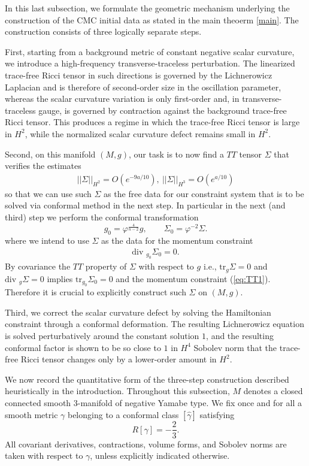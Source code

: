 \documentclass{amsart}
\renewcommand{\div}{\mbox{div }}
\newcommand{\tr}{\mbox{tr}}
\begin{document}
\noindent In this last subsection, we formulate the geometric mechanism underlying the construction of the CMC initial data as stated in the main theoerm \ref{main}. The construction consists of three logically separate steps.

\noindent First, starting from a background metric of constant negative scalar curvature, we introduce a high-frequency transverse-traceless perturbation. The linearized trace-free Ricci tensor in such directions is governed by the Lichnerowicz Laplacian and is therefore of second-order size in the oscillation parameter, whereas the scalar curvature variation is only first-order and, in transverse-traceless gauge, is governed by contraction against the background trace-free Ricci tensor. This produces a regime in which the trace-free Ricci tensor is large in \(H^{2}\), while the normalized scalar curvature defect remains small in \(H^{2}\).

\noindent Second, on this manifold $(M,g)$, our task is to now find a $TT$ tensor $\Sigma$ that verifies the estimates 
\begin{align}
||\Sigma||_{H^{2}}=O(e^{-9a/10}),~||\Sigma||_{H^{3}}=O(e^{a/10})
\end{align}
so that we can use such $\Sigma$ as the free data for our constraint system that is to be solved via conformal method in the next step. In particular in the next (and third) step we perform the conformal transformation 
\[
g_{0}=\varphi^{\frac{4}{n-2}}g,
\qquad
\Sigma_{0}=\varphi^{-2}\Sigma.
\]
where we intend to use $\Sigma$ as the data for the momentum constraint 
\begin{align}
\label{eq:TT1}
\div_{g_{0}}\Sigma_{0}=0.
\end{align}
By covariance the $TT$ property of $\Sigma$ with respect to $g$ i.e., $\tr_{g}\Sigma=0$ and $\div_{g}\Sigma=0$ implies $\tr_{g_{0}}\Sigma_{0}=0$ and the momentum constraint (\ref{eq:TT1}). Therefore it is crucial to explicitly construct such $\Sigma$ on $(M,g)$. 

\noindent Third, we correct the scalar curvature defect by solving the Hamiltonian constraint through a conformal deformation. The resulting Lichnerowicz equation is solved perturbatively around the constant solution \(1\), and the resulting conformal factor is shown to be so close to \(1\) in $H^{4}$ Sobolev norm that the trace-free Ricci tensor changes only by a lower-order amount in \(H^{2}\).




\noindent We now record the quantitative form of the three-step construction described heuristically in the introduction. Throughout this subsection, \(M\) denotes a closed connected smooth \(3\)-manifold of negative Yamabe type. We fix once and for all a smooth metric \(\gamma\) belonging to a conformal class $[\widehat{\gamma}]$ satisfying
\[
R[\gamma]=-\frac23.
\]
All covariant derivatives, contractions, volume forms, and Sobolev norms are taken with respect to \(\gamma\), unless explicitly indicated otherwise.
\end{document}

